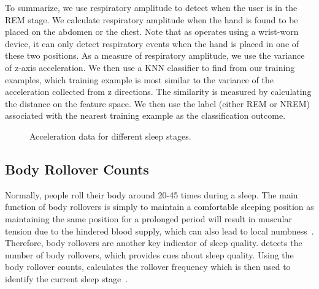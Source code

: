  To summarize, we use respiratory amplitude to detect when the user is in the REM stage.  We calculate respiratory
amplitude when the hand is found to be placed on the abdomen or the chest. {Note that as {\systemname} operates using a wrist-worn device,
it can only detect respiratory events when the hand is placed in one of these two positions. As a measure of respiratory amplitude, we use}
the variance of z-axis acceleration. We then use a KNN classifier to find from our training examples, which training example is most
similar to the variance of the acceleration collected from z directions. The similarity is measured by calculating the distance on the
feature space. We then use the label (either REM or NREM) associated with the nearest training example as the classification outcome.

\begin{figure}[!t]
	\centering
    \vspace{-2mm}
	\caption{Acceleration data for different sleep stages.}\label{fig:cordi}
    \vspace{-2mm}
\end{figure}

\subsection{Body Rollover Counts\label{sec:bodyrollover}}

Normally, people roll their body around 20-45 times during a sleep. The main function of body rollovers is simply to maintain a comfortable
sleeping position as maintaining the same position for a prolonged period will result in muscular tension due to the hindered blood supply,
which can also lead to local numbness~\cite{rollover2014}. Therefore, body rollovers are another key indicator of sleep quality.
{{\systemname} detects the number of body rollovers, which provides cues about sleep quality. Using the body rollover counts, \systemname
calculates the rollover frequency which is then used to identify the current sleep stage~\cite{rollover2007}}.

